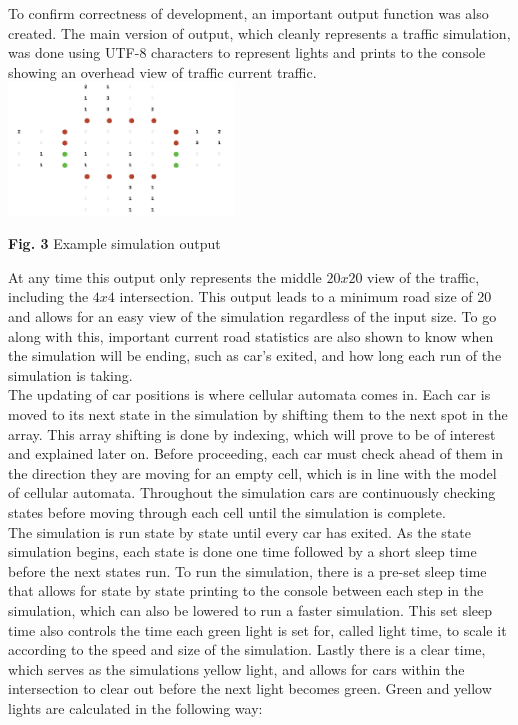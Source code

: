 \documentclass[conference]{IEEEtran}
\begin{document}
\hspace*{.2cm} To confirm correctness of development, an important output function was also created. The main version of output, which cleanly represents a traffic simulation, was done using UTF-8 characters to represent lights and prints to the console showing an overhead view of traffic current traffic. \\

\includegraphics[width=0.45\textwidth]{output}
\begin{center}
	\textbf{Fig. 3} Example simulation output  \\
\end{center}


At any time this output only represents the middle $20x20$ view of the traffic, including the $4x4$ intersection. This output leads to a minimum road size of 20 and allows for an easy view of the simulation regardless of the input size. To go along with this, important current road statistics are also shown to know when the simulation will be ending, such as car's exited, and how long each run of the simulation is taking.  \\
\hspace*{.2cm} The updating of car positions is where cellular automata comes in. Each car is moved to its next state in the simulation by shifting them to the next spot in the array. This array shifting is done by indexing, which will prove to be of interest and explained later on. Before proceeding, each car must check ahead of them in the direction they are moving for an empty cell, which is in line with the model of cellular automata. Throughout the simulation cars are continuously checking states before moving through each cell until the simulation is complete. \\

\hspace*{.2cm}  The simulation is run state by state until every car has exited. As the state simulation begins, each state is done one time followed by a short sleep time before the next states run. To run the simulation, there is a pre-set sleep time that allows for state by state printing to the console between each step in the simulation, which can also be lowered to run a faster simulation. This set sleep time also controls the time each green light is set for, called light time, to scale it according to the speed and size of the simulation. Lastly there is a clear time, which serves as the simulations yellow light, and allows for cars within the intersection to clear out before the next light becomes green. Green and yellow lights are calculated in the following way: \\
\end{document}
